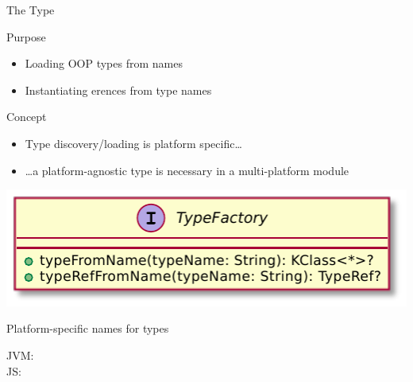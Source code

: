 \documentclass[handout]{beamer}
\begin{document}
\begin{frame}[allowframebreaks]{The  Type}
    \begin{block}{Purpose}
        \begin{itemize}
            \item Loading OOP types from names
            \item Instantiating erences from type names
        \end{itemize}
    \end{block}

    \begin{alertblock}{Concept}
        \begin{itemize}
            \item Type discovery/loading is platform specific\ldots
            \item \ldots a platform-agnostic type is necessary in a multi-platform module
        \end{itemize}
    \end{alertblock}

    \framebreak

    \begin{center}
        \includegraphics[width=.5\linewidth]{img/TypeFactory.pdf}
    \end{center}

    \framebreak

    \begin{alertblock}{Platform-specific names for types}
        \begin{description}
            \item[JVM:] 
            \item[JS:]   
        \end{description}
    \end{alertblock}
\end{frame}
\end{document}
